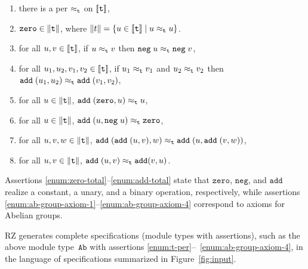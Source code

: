 \begin{enumerate}
\item
  \label{enum:t-per}%
  there is a per $\approx_{\mathtt{t}}$ on $[\![\mathtt{t}]\!]$,
\item
  \label{enum:zero-total}%
  $\mathtt{zero} \in \|\mathtt{t}\|$, where $\|t\| =
  \{u \in [\![\mathtt{t}]\!] \mid u \approx_{\mathtt{t}} u\}$.
\item
  \label{enum:neg-total}%
  for all $u, v \in [\![\mathtt{t}]\!]$, if $u \approx_{\mathtt{t}} v$ then
  $\mathtt{neg} \; u \approx_{\mathtt{t}} \mathtt{neg} \; v$,
\item
  \label{enum:add-total}%
  for all $u_1, u_2, v_1, v_2 \in [\![\mathtt{t}]\!]$, if $u_1
  \approx_{\mathtt{t}} v_1$ and $u_2 \approx_{\mathtt{t}} v_2$ then $\mathtt{add} \; (u_1,
  u_2) \approx_{\mathtt{t}} \mathtt{add} \; (v_1, v_2)$,
\item 
  \label{enum:ab-group-axiom-1}%
  for all $u \in \|\mathtt{t}\|$, $\mathtt{add} \;
  (\mathtt{zero}, u) \approx_{\mathtt{t}} u$,
\item
  \label{enum:ab-group-axiom-2}%
  for all $u \in \|\mathtt{t}\|$, $\mathtt{add} \; (u,
  \mathtt{neg} \; u) \approx_{\mathtt{t}} \mathtt{zero}$,
\item
  \label{enum:ab-group-axiom-3}%
  for all $u, v, w \in \|\mathtt{t}\|$, $\mathtt{add} \;
  (\mathtt{add} \; (u, v), w) \approx_{\mathtt{t}} \mathtt{add} \; (u,
  \mathtt{add} \; (v, w))$,
\item
  \label{enum:ab-group-axiom-4}%
  for all $u, v \in \|\mathtt{t}\|$, $\mathtt{add} \; (u, v)
  \approx_{\mathtt{t}} \mathtt{add} (v, u)$.
\end{enumerate}
%
Assertions \ref{enum:zero-total}--\ref{enum:add-total} state that
$\mathtt{zero}$, $\mathtt{neg}$, and $\mathtt{add}$ realize a
constant, a unary, and a binary operation, respectively, while
assertions \ref{enum:ab-group-axiom-1}--\ref{enum:ab-group-axiom-4}
correspond to axioms for Abelian groups.

RZ generates complete specifications (module types with assertions),
such as the above module type~$\mathtt{Ab}$ with assertions
\ref{enum:t-per}--~\ref{enum:ab-group-axiom-4}, in the language of
specifications summarized in Figure~\ref{fig:input}.

